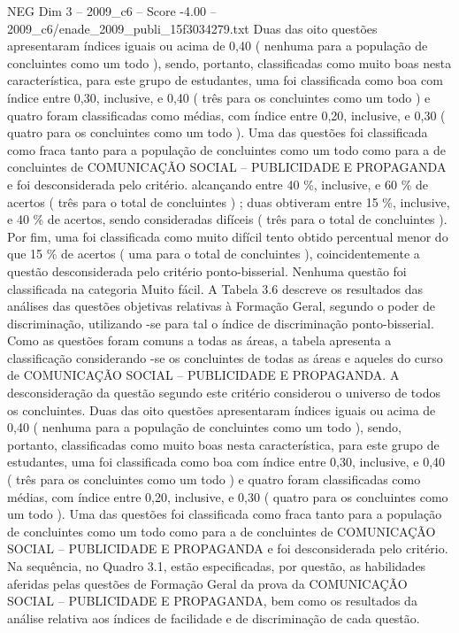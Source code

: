 \begin{textsample}{NEG Dim 3 – 2009\_c6 – Score -4.00 – 2009\_c6/enade\_2009\_publi\_15f3034279.txt}
Duas das oito questões apresentaram índices iguais ou acima de 0,40 ( nenhuma para a população de concluintes como um todo ), sendo, portanto, classificadas como muito boas nesta característica, para este grupo de estudantes, uma foi classificada como boa com índice entre 0,30, inclusive, e 0,40 ( três para os concluintes como um todo ) e quatro foram classificadas como médias, com índice entre 0,20, inclusive, e 0,30 ( quatro para os concluintes como um todo ).
Uma das questões foi classificada como fraca tanto para a população de concluintes como um todo como para a de concluintes de COMUNICAÇÃO SOCIAL – PUBLICIDADE E PROPAGANDA e foi desconsiderada pelo critério. alcançando entre 40 \%, inclusive, e 60 \% de acertos ( três para o total de concluintes ) ; duas obtiveram entre 15 \%, inclusive, e 40 \% de acertos, sendo consideradas difíceis ( três para o total de concluintes ).
Por fim, uma foi classificada como muito difícil tento obtido percentual menor do que 15 \% de acertos ( uma para o total de concluintes ), coincidentemente a questão desconsiderada pelo critério ponto-bisserial.
Nenhuma questão foi classificada na categoria Muito fácil.
A Tabela 3.6 descreve os resultados das análises das questões objetivas relativas à Formação Geral, segundo o poder de discriminação, utilizando -se para tal o índice de discriminação ponto-bisserial.
Como as questões foram comuns a todas as áreas, a tabela apresenta a classificação considerando -se os concluintes de todas as áreas e aqueles do curso de COMUNICAÇÃO SOCIAL – PUBLICIDADE E PROPAGANDA.
A desconsideração da questão segundo este critério considerou o universo de todos os concluintes.
Duas das oito questões apresentaram índices iguais ou acima de 0,40 ( nenhuma para a população de concluintes como um todo ), sendo, portanto, classificadas como muito boas nesta característica, para este grupo de estudantes, uma foi classificada como boa com índice entre 0,30, inclusive, e 0,40 ( três para os concluintes como um todo ) e quatro foram classificadas como médias, com índice entre 0,20, inclusive, e 0,30 ( quatro para os concluintes como um todo ).
Uma das questões foi classificada como fraca tanto para a população de concluintes como um todo como para a de concluintes de COMUNICAÇÃO SOCIAL – PUBLICIDADE E PROPAGANDA e foi desconsiderada pelo critério.
Na sequência, no Quadro 3.1, estão especificadas, por questão, as habilidades aferidas pelas questões de Formação Geral da prova da COMUNICAÇÃO SOCIAL – PUBLICIDADE E PROPAGANDA, bem como os resultados da análise relativa aos índices de facilidade e de discriminação de cada questão.

\end{textsample}

